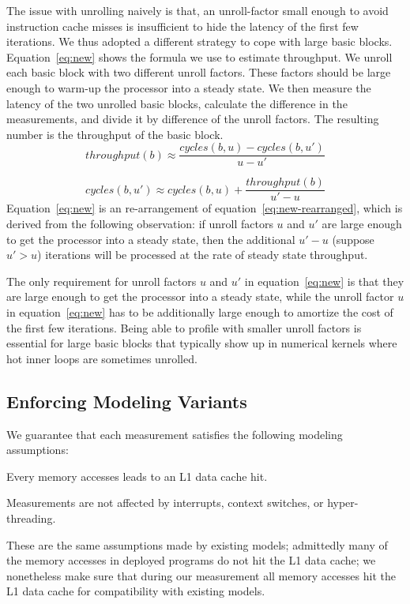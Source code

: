 The issue with unrolling naively is that,
an unroll-factor small enough to 
avoid instruction cache misses is 
insufficient to hide the latency of the first few iterations.
We thus adopted a different strategy to cope with large basic blocks.
Equation~\ref{eq:new} shows the formula we use to estimate throughput.
We unroll each basic block with two different unroll factors.
These factors should be large enough 
to warm-up the processor into a steady state.
We then measure the latency of the two unrolled basic blocks,
calculate the difference in the measurements, and divide it 
by difference of the unroll factors.
The resulting number is the throughput of the basic block.
\begin{equation}
\mathit{throughput}(b) \approx 
\frac{\mathit{cycles}(b, u) - \mathit{cycles}(b, u')}{u-u'}
\label{eq:new}
\end{equation}

\begin{equation}
\mathit{cycles}(b, u') \approx 
\mathit{cycles}(b, u) + \frac{\mathit{throughput(b)}}{u'-u}
\label{eq:new-rearranged}
\end{equation}
Equation~\ref{eq:new} is an re-arrangement of equation~\ref{eq:new-rearranged},
which is derived from the following observation:
if unroll factors $u$ and $u'$ are large enough
to get the processor into a steady state,
then the additional $u'-u$ (suppose $u' > u$) iterations will be processed at 
the rate of steady state throughput.

The only requirement for unroll factors $u$ and $u'$ in equation~\ref{eq:new}
is that they are large enough to get the processor into a steady state,
while the unroll factor $u$ in equation~\ref{eq:new} has to be additionally
large enough to amortize the cost of the first few iterations.
Being able to profile with smaller unroll factors is essential
for large basic blocks that typically show up in numerical kernels where
hot inner loops are sometimes unrolled.

\subsection{Enforcing Modeling Variants}\label{sec:invariants}
We guarantee that each measurement satisfies the following modeling assumptions:
\begin{enumerate*}
    \item Every memory accesses leads to an L1 data cache hit. 
    \item Measurements are not affected by interrupts, context switches,
    or hyper-threading.
\end{enumerate*}
These are the same assumptions made by existing models;
admittedly many of the memory accesses in deployed programs do not hit the L1 data cache;
we nonetheless make sure that during our measurement all memory accesses hit the L1 data cache for compatibility with existing models.

